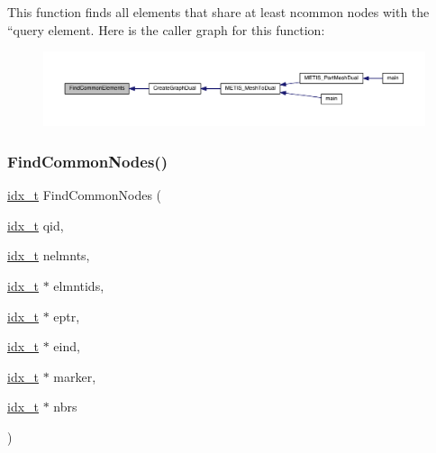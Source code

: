 This function finds all elements that share at least ncommon nodes with the ``query\textquotesingle{}\textquotesingle{} element. Here is the caller graph for this function\+:\nopagebreak
\begin{figure}[H]
\begin{center}
\leavevmode
\includegraphics[width=350pt]{a00945_ab05bd1b0bb5bdaaf2e9dc8906675145c_icgraph}
\end{center}
\end{figure}
\mbox{\label{a00945_aa3fb3adf98a0168ead1ff715114ebea1}} 
\subsubsection{\texorpdfstring{Find\+Common\+Nodes()}{FindCommonNodes()}}
{\footnotesize\ttfamily \hyperlink{a00876_aaa5262be3e700770163401acb0150f52}{idx\+\_\+t} Find\+Common\+Nodes (\begin{DoxyParamCaption}\item[{\hyperlink{a00876_aaa5262be3e700770163401acb0150f52}{idx\+\_\+t}}]{qid,  }\item[{\hyperlink{a00876_aaa5262be3e700770163401acb0150f52}{idx\+\_\+t}}]{nelmnts,  }\item[{\hyperlink{a00876_aaa5262be3e700770163401acb0150f52}{idx\+\_\+t} $\ast$}]{elmntids,  }\item[{\hyperlink{a00876_aaa5262be3e700770163401acb0150f52}{idx\+\_\+t} $\ast$}]{eptr,  }\item[{\hyperlink{a00876_aaa5262be3e700770163401acb0150f52}{idx\+\_\+t} $\ast$}]{eind,  }\item[{\hyperlink{a00876_aaa5262be3e700770163401acb0150f52}{idx\+\_\+t} $\ast$}]{marker,  }\item[{\hyperlink{a00876_aaa5262be3e700770163401acb0150f52}{idx\+\_\+t} $\ast$}]{nbrs }\end{DoxyParamCaption})}


